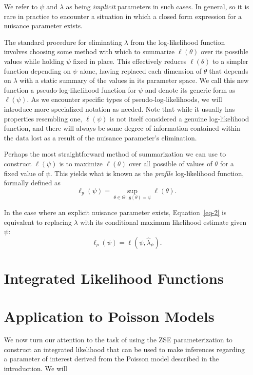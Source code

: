 \documentclass[
  12pt]{article}
\begin{document}
We refer to \(\psi\) and \(\lambda\) as being \emph{implicit} parameters
in such cases. In general, so it is rare in practice to encounter a
situation in which a closed form expression for a nuisance parameter
exists.

The standard procedure for eliminating \(\lambda\) from the
log-likelihood function involves choosing some method with which to
summarize \(\ell(\theta)\) over its possible values while holding
\(\psi\) fixed in place. This effectively reduces \(\ell(\theta)\) to a
simpler function depending on \(\psi\) alone, having replaced each
dimension of \(\theta\) that depends on \(\lambda\) with a static
summary of the values in its parameter space. We call this new function
a pseudo-log-likelihood function for \(\psi\) and denote its generic
form as \(\ell(\psi)\). As we encounter specific types of
pseudo-log-likelihoods, we will introduce more specialized notation as
needed. Note that while it usually has properties resembling one,
\(\ell(\psi)\) is not itself considered a genuine log-likelihood
function, and there will always be some degree of information contained
within the data lost as a result of the nuisance parameter's
elimination.

Perhaps the most straightforward method of summarization we can use to
construct \(\ell(\psi)\) is to maximize \(\ell(\theta)\) over all
possible of values of \(\theta\) for a fixed value of \(\psi\). This
yields what is known as the \emph{profile} log-likelihood function,
formally defined as \[
\ell_p(\psi) = \sup_{\theta \in \Theta: \> g(\theta) = \psi} \ell(\theta).
\]

In the case where an explicit nuisance parameter exists,
Equation~\ref{eq-2} is equivalent to replacing \(\lambda\) with its
conditional maximum likelihood estimate given \(\psi\): \[
\ell_p(\psi) = \ell(\psi, \hat{\lambda}_{\psi}).
\]

\section{Integrated Likelihood
Functions}\label{integrated-likelihood-functions}

\section{Application to Poisson
Models}\label{application-to-poisson-models}

We now turn our attention to the task of using the ZSE parameterization
to construct an integrated likelihood that can be used to make
inferences regarding a parameter of interest derived from the Poisson
model described in the introduction. We will
\end{document}
